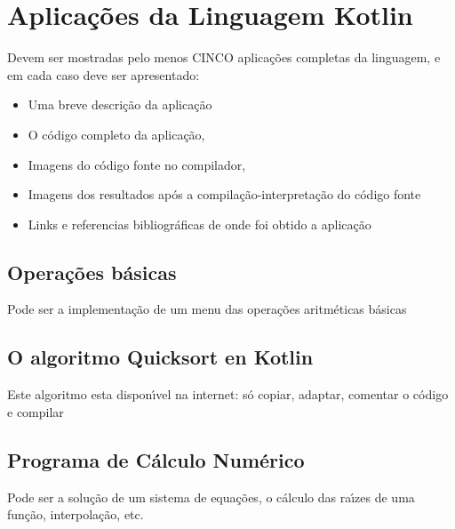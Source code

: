 

\chapter{ Aplica\c{c}\~{o}es da Linguagem Kotlin}

Devem ser mostradas pelo menos CINCO aplica\c{c}\~{o}es completas da linguagem, e em cada caso deve ser apresentado:
\begin{itemize}
  \item Uma breve descri\c{c}\~{a}o da aplica\c{c}\~{a}o
  \item O c\'{o}digo completo da aplica\c{c}\~{a}o,
  \item Imagens do c\'{o}digo fonte no compilador,
  \item Imagens dos resultados ap\'{o}s a compila\c{c}\~{a}o-interpreta\c{c}\~{a}o do c\'{o}digo fonte
  \item Links e referencias bibliogr\'{a}ficas de onde foi obtido a aplica\c{c}\~{a}o
\end{itemize}



    \section{Opera\c{c}\~{o}es b\'{a}sicas}
    Pode ser a implementa\c{c}\~{a}o de um menu das opera\c{c}\~{o}es aritm\'{e}ticas b\'{a}sicas



    \section{O algoritmo Quicksort en Kotlin}
    Este algoritmo esta dispon\'{\i}vel na internet: s\'{o} copiar, adaptar, comentar o c\'{o}digo e compilar



    \section{Programa de C\'{a}lculo Num\'{e}rico}
    Pode ser a solu\c{c}\~{a}o de um sistema de equa\c{c}\~{o}es, o c\'{a}lculo das ra\'{\i}zes de uma fun\c{c}\~{a}o,  interpola\c{c}\~{a}o, etc.


